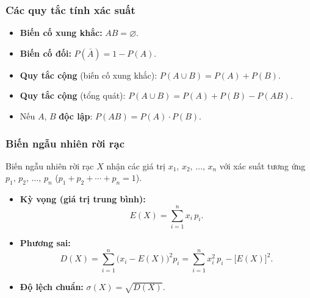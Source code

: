 \documentclass[12pt,a4paper]{article}
\begin{document}
\subsubsection{Các quy tắc tính xác suất}

\begin{dinhnghia}
  \begin{itemize}
    \item \textbf{Biến cố xung khắc:} $AB = \varnothing$.
    \item \textbf{Biến cố đối:} $P(\bar{A}) = 1 - P(A)$.
  \end{itemize}
\end{dinhnghia}

\begin{congthuc}
  \begin{itemize}
    \item \textbf{Quy tắc cộng} (biến cố xung khắc):
      \;$P(A \cup B) = P(A) + P(B)$.
    \item \textbf{Quy tắc cộng} (tổng quát):
      \;$P(A \cup B) = P(A) + P(B) - P(AB)$.
    \item Nếu $A$, $B$ \textbf{độc lập}:
      \;$P(AB) = P(A) \cdot P(B)$.
  \end{itemize}
\end{congthuc}

\subsubsection{Biến ngẫu nhiên rời rạc}

\begin{dinhnghia}
  Biến ngẫu nhiên rời rạc $X$ nhận các giá trị $x_1,\, x_2,\, \ldots,\, x_n$ với xác suất tương ứng $p_1,\, p_2,\, \ldots,\, p_n$ \;($p_1 + p_2 + \cdots + p_n = 1$).
\end{dinhnghia}

\begin{congthuc}
  \begin{itemize}
    \item \textbf{Kỳ vọng (giá trị trung bình):}
      \[
        E(X) = \sum_{i=1}^{n} x_i\, p_i.
      \]
    \item \textbf{Phương sai:}
      \[
        D(X) = \sum_{i=1}^{n} \bigl(x_i - E(X)\bigr)^2 p_i
        = \sum_{i=1}^{n} x_i^2\, p_i - \bigl[E(X)\bigr]^2.
      \]
    \item \textbf{Độ lệch chuẩn:}
      $\sigma(X) = \sqrt{D(X)}$.
  \end{itemize}
\end{congthuc}
\end{document}
